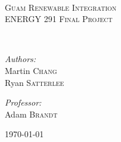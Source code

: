 \begin{titlepage}
  \begin{center}

    \HRule \\[0.4cm]

    \textsc{\LARGE Guam Renewable Integration}\\[0.2cm]
    \textsc{\large ENERGY 291 Final Project}
    
    
    \HRule \\[1.5cm]

    \begin{minipage}{0.45\textwidth}
      \begin{flushleft} \large
        \emph{Authors:}\\
        Martin \textsc{Chang}\\
        Ryan \textsc{Satterlee}
      \end{flushleft}
    \end{minipage}
    \begin{minipage}{0.5\textwidth}
      \begin{flushright} \large
        \emph{Professor:}\\
        Adam \textsc{Brandt}\\%
        \emph{}
      \end{flushright}
    \end{minipage}

    \vfill
    {\large \today}

  \end{center}
\end{titlepage}